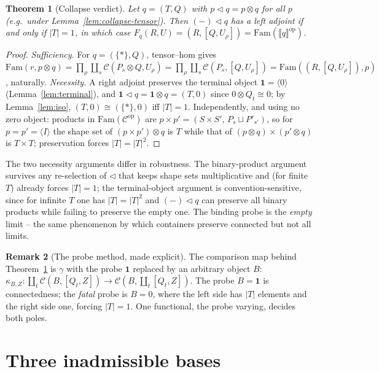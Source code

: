 \documentclass[11pt]{amsart}
\theoremstyle{plain}
\newtheorem{theorem}{Theorem}[section]
\theoremstyle{definition}
\newtheorem{remark}[theorem]{Remark}
\newcommand{\C}{\mathcal{C}}
\newcommand{\Fam}{\mathrm{Fam}}
\newcommand{\ext}[1]{\llbracket #1 \rrbracket}
\newcommand{\op}{\mathrm{op}}
\newcommand{\comp}{\mathbin{\triangleleft}}
\newcommand{\one}{\mathbf{1}}
\newcommand{\gena}[1]{\langle #1 \rangle}
\begin{document}
\begin{theorem}[Collapse verdict]\label{thm:2}
Let $q=(T,Q)$ with $p\comp q=p\otimes q$ for all $p$ (e.g.\ under Lemma~\ref{lem:collapse-tensor}).
Then $({-})\comp q$ has a left adjoint if and only if $|T|=1$, in which case
$F_q(R,U)=(R,[Q,U_\rho])=\Fam(\ext q^{\op})$.
\end{theorem}
\begin{proof}
\emph{Sufficiency.} For $q=(\{*\},Q)$, tensor--hom gives $\Fam(r,p\otimes q)=\prod_\rho\coprod_s
\C(P_s\otimes Q,U_\rho)=\prod_\rho\coprod_s\C(P_s,[Q,U_\rho])=\Fam((R,[Q,U_\rho]),p)$, naturally.
\emph{Necessity.} A right adjoint preserves the terminal object $\one=\gena{0}$
(Lemma~\ref{lem:terminal}), and $\one\comp q=\one\otimes q=(T,0)$ since $0\otimes Q_t\cong 0$; by
Lemma~\ref{lem:iso}, $(T,0)\cong(\{*\},0)$ iff $|T|=1$. Independently, and using no zero object:
products in $\Fam(\C^{\op})$ are $p\times p'=(S\times S',\,P_s\sqcup P'_{s'})$, so for
$p=p'=\gena{I}$ the shape set of $(p\times p')\otimes q$ is $T$ while that of
$(p\otimes q)\times(p'\otimes q)$ is $T\times T$; preservation forces $|T|=|T|^2$.
\end{proof}

The two necessity arguments differ in robustness. The binary-product argument survives any
re-selection of $\comp$ that keeps shape sets multiplicative and (for finite $T$) already forces
$|T|=1$; the terminal-object argument is convention-sensitive, since for infinite $T$ one has
$|T|=|T|^2$ and $({-})\comp q$ can preserve all binary products while failing to preserve the empty
one. The binding probe is the \emph{empty} limit -- the same phenomenon by which containers preserve
connected but not all limits.

\begin{remark}[The probe method, made explicit]\label{rem:fatalprobe}
The comparison map behind Theorem~\ref{thm:2} is $\gamma$ with the probe $\one$ replaced by an
arbitrary object $B$: $\kappa_{B,Z}:\coprod_t\C(B,[Q_t,Z])\to\C(B,\coprod_t[Q_t,Z])$. The probe
$B=\one$ is connectedness; the \emph{fatal} probe is $B=0$, where the left side has $|T|$ elements and
the right side one, forcing $|T|=1$. One functional, the probe varying, decides both poles.
\end{remark}

\section{Three inadmissible bases}\label{sec:inadmissible}
\end{document}
